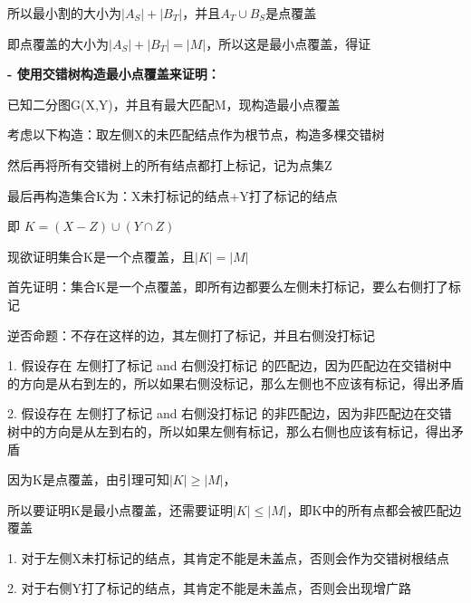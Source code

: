 \documentclass[UTF8]{ctexart}
\begin{document}
\begin{enumerate}
            所以最小割的大小为$|A_S|+|B_T|$，并且$A_T\cup B_S$是点覆盖

            即点覆盖的大小为$|A_S|+|B_T|=|M|$，所以这是最小点覆盖，得证

            \vspace{3cm}


            \textbf{- 使用交错树构造最小点覆盖来证明：}

            已知二分图G(X,Y)，并且有最大匹配M，现构造最小点覆盖

            考虑以下构造：取左侧X的未匹配结点作为根节点，构造多棵交错树

            然后再将所有交错树上的所有结点都打上标记，记为点集Z

            最后再构造集合K为：X未打标记的结点+Y打了标记的结点

            即 $K=(X-Z)\cup(Y\cap Z)$

            现欲证明集合K是一个点覆盖，且$|K|=|M|$

            \vspace{2.5cm}

            首先证明：集合K是一个点覆盖，即所有边都要么左侧未打标记，要么右侧打了标记

            逆否命题：不存在这样的边，其左侧打了标记，并且右侧没打标记

            \vspace{0.3cm}

            1. 假设存在 左侧打了标记 and 右侧没打标记 的匹配边，因为匹配边在交错树中的方向是从右到左的，所以如果右侧没标记，那么左侧也不应该有标记，得出矛盾

            2. 假设存在 左侧打了标记 and 右侧没打标记 的非匹配边，因为非匹配边在交错树中的方向是从左到右的，所以如果左侧有标记，那么右侧也应该有标记，得出矛盾

            \vspace{0.8cm}

            因为K是点覆盖，由引理可知$|K|\ge|M|$，

            所以要证明K是最小点覆盖，还需要证明$|K|\le|M|$，即K中的所有点都会被匹配边覆盖

            \vspace{0.3cm}

            1. 对于左侧X未打标记的结点，其肯定不能是未盖点，否则会作为交错树根结点

            2. 对于右侧Y打了标记的结点，其肯定不能是未盖点，否则会出现增广路

            \vspace{0.2cm}


\end{enumerate}
\end{document}
